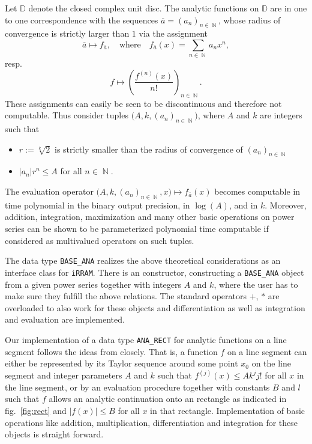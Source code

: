 \documentclass{article}
\newcommand{\DD}{\mathbb D}
\DeclareMathOperator{\NN}{\mathbb N}
\newcommand{\irram}{\texttt{iRRAM}\xspace}
\newcommand{\BA}{\texttt{BASE\_ANA}\xspace}
\newcommand{\AR}{\texttt{ANA\_RECT}\xspace}
\begin{document}
Let $\DD$ denote the closed complex unit disc.
The analytic functions on $\DD$ are in one to one correspondence with the sequences $\overline a = (a_n)_{n\in \NN}$, whose radius of convergence is strictly larger than $1$ via the assignment
\[ \overline a \mapsto f_{\overline a}, \quad\text{where}\quad f_{\overline a}(x)= \sum_{n\in \NN} a_n x^n, \]
resp.
\[ f \mapsto \left(\frac{f^{(n)}(x)}{n!}\right)_{n\in \NN}. \]
These assignments can easily be seen to be discontinuous and therefore not computable.
Thus consider tuples $\big(A,k,(a_n)_{n\in\NN}\big)$, where $A$ and $k$ are integers such that
\begin{itemize}
\item $r:=\sqrt[k]{2}$ is strictly smaller than the radius of convergence of $(a_n)_{n\in \NN}$
\item $|a_n|  r^n \leq A$ for all $n\in \NN$.
\end{itemize}
The evaluation operator $\big(A,k,(a_n)_{n\in \NN},x\big)\mapsto f_{\overline a}(x)$ becomes computable in time polynomial in the binary output precision, in $\log(A)$, and in $k$.
Moreover, addition, integration, maximization and many other basic operations on power series can be shown to be parameterized polynomial time computable if considered as multivalued operators on such tuples.

The data type \BA realizes the above theoretical considerations as an interface class for \irram.
There is an constructor, constructing a \BA object from a given power series together with integers $A$ and $k$, where the user has to make sure they fulfill the above relations.
The standard operators $+$, $*$ are overloaded to also work for these objects and differentiation as well as integration and evaluation are implemented.

Our implementation of a data type \AR for analytic functions on a line segment follows the ideas from \cite{Kawamura2012} closely.
That is, a function $f$ on a line segment can either be represented by its Taylor sequence around some point $x_0$ on the line segment and integer parameters $A$ and $k$ such that $f^{(j)}(x)\leq A k^j j!$ for all $x$ in the line segment, or by an evaluation procedure together with constants $B$ and $l$ such that $f$ allows an analytic continuation onto an rectangle as indicated in fig.~\ref{fig:rect} and $|f(x)|\leq B$ for all $x$ in that rectangle.
Implementation of basic operations like addition, multiplication, differentiation and integration for these objects is straight forward.
\end{document}
